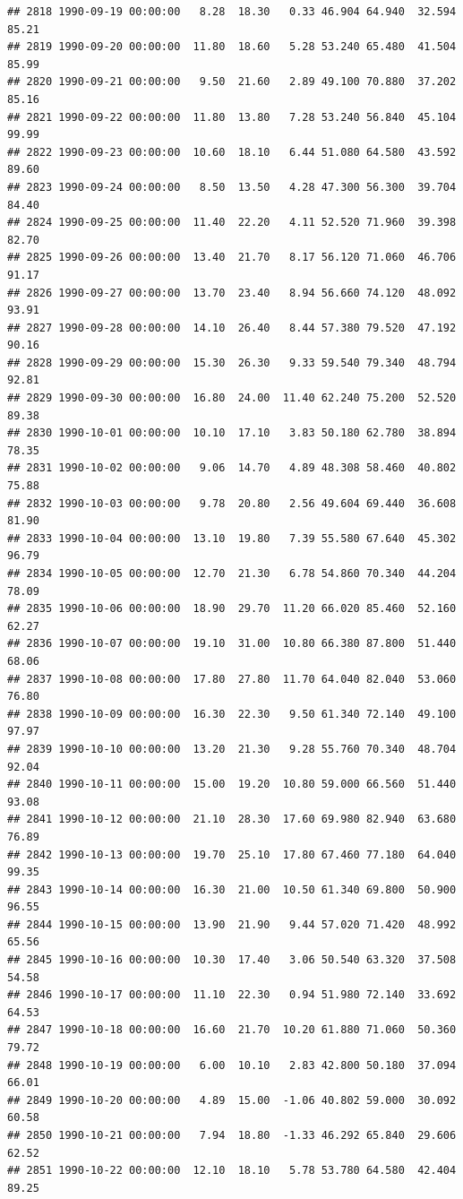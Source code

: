 \documentclass{article}\usepackage{graphicx, color}
\makeatletter
\newenvironment{kframe}{%
 \def\at@end@of@kframe{}%
 \ifinner\ifhmode%
  \def\at@end@of@kframe{\end{minipage}}%
  \begin{minipage}{\columnwidth}%
 \fi\fi%
 \def\FrameCommand##1{\hskip\@totalleftmargin \hskip-\fboxsep
 \colorbox{shadecolor}{##1}\hskip-\fboxsep
     \hskip-\linewidth \hskip-\@totalleftmargin \hskip\columnwidth}%
 \MakeFramed {\advance\hsize-\width
   \@totalleftmargin\z@ \linewidth\hsize
   \@setminipage}}%
 {\par\unskip\endMakeFramed%
 \at@end@of@kframe}
\newenvironment{knitrout}{}{} %
\makeatother
\begin{document}
\begin{knitrout}
\begin{kframe}
\begin{verbatim}
## 2818 1990-09-19 00:00:00   8.28  18.30   0.33 46.904 64.940  32.594  85.21
## 2819 1990-09-20 00:00:00  11.80  18.60   5.28 53.240 65.480  41.504  85.99
## 2820 1990-09-21 00:00:00   9.50  21.60   2.89 49.100 70.880  37.202  85.16
## 2821 1990-09-22 00:00:00  11.80  13.80   7.28 53.240 56.840  45.104  99.99
## 2822 1990-09-23 00:00:00  10.60  18.10   6.44 51.080 64.580  43.592  89.60
## 2823 1990-09-24 00:00:00   8.50  13.50   4.28 47.300 56.300  39.704  84.40
## 2824 1990-09-25 00:00:00  11.40  22.20   4.11 52.520 71.960  39.398  82.70
## 2825 1990-09-26 00:00:00  13.40  21.70   8.17 56.120 71.060  46.706  91.17
## 2826 1990-09-27 00:00:00  13.70  23.40   8.94 56.660 74.120  48.092  93.91
## 2827 1990-09-28 00:00:00  14.10  26.40   8.44 57.380 79.520  47.192  90.16
## 2828 1990-09-29 00:00:00  15.30  26.30   9.33 59.540 79.340  48.794  92.81
## 2829 1990-09-30 00:00:00  16.80  24.00  11.40 62.240 75.200  52.520  89.38
## 2830 1990-10-01 00:00:00  10.10  17.10   3.83 50.180 62.780  38.894  78.35
## 2831 1990-10-02 00:00:00   9.06  14.70   4.89 48.308 58.460  40.802  75.88
## 2832 1990-10-03 00:00:00   9.78  20.80   2.56 49.604 69.440  36.608  81.90
## 2833 1990-10-04 00:00:00  13.10  19.80   7.39 55.580 67.640  45.302  96.79
## 2834 1990-10-05 00:00:00  12.70  21.30   6.78 54.860 70.340  44.204  78.09
## 2835 1990-10-06 00:00:00  18.90  29.70  11.20 66.020 85.460  52.160  62.27
## 2836 1990-10-07 00:00:00  19.10  31.00  10.80 66.380 87.800  51.440  68.06
## 2837 1990-10-08 00:00:00  17.80  27.80  11.70 64.040 82.040  53.060  76.80
## 2838 1990-10-09 00:00:00  16.30  22.30   9.50 61.340 72.140  49.100  97.97
## 2839 1990-10-10 00:00:00  13.20  21.30   9.28 55.760 70.340  48.704  92.04
## 2840 1990-10-11 00:00:00  15.00  19.20  10.80 59.000 66.560  51.440  93.08
## 2841 1990-10-12 00:00:00  21.10  28.30  17.60 69.980 82.940  63.680  76.89
## 2842 1990-10-13 00:00:00  19.70  25.10  17.80 67.460 77.180  64.040  99.35
## 2843 1990-10-14 00:00:00  16.30  21.00  10.50 61.340 69.800  50.900  96.55
## 2844 1990-10-15 00:00:00  13.90  21.90   9.44 57.020 71.420  48.992  65.56
## 2845 1990-10-16 00:00:00  10.30  17.40   3.06 50.540 63.320  37.508  54.58
## 2846 1990-10-17 00:00:00  11.10  22.30   0.94 51.980 72.140  33.692  64.53
## 2847 1990-10-18 00:00:00  16.60  21.70  10.20 61.880 71.060  50.360  79.72
## 2848 1990-10-19 00:00:00   6.00  10.10   2.83 42.800 50.180  37.094  66.01
## 2849 1990-10-20 00:00:00   4.89  15.00  -1.06 40.802 59.000  30.092  60.58
## 2850 1990-10-21 00:00:00   7.94  18.80  -1.33 46.292 65.840  29.606  62.52
## 2851 1990-10-22 00:00:00  12.10  18.10   5.78 53.780 64.580  42.404  89.25

\end{verbatim}
\end{kframe}
\end{knitrout}
\end{document}
